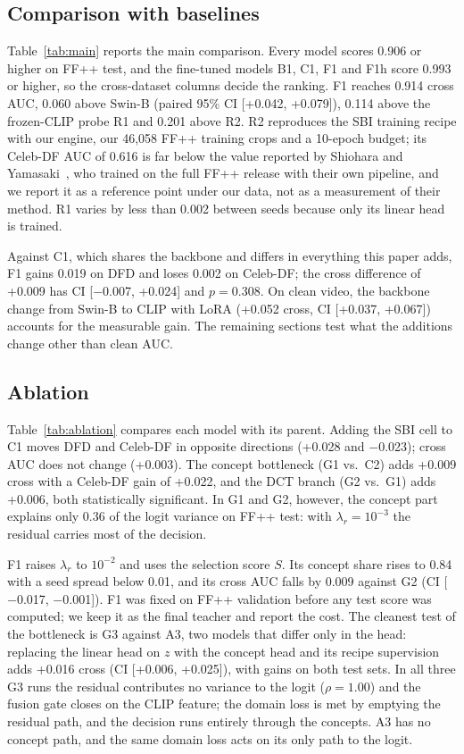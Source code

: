 \documentclass[conference]{IEEEtran}
\begin{document}


\subsection{Comparison with baselines}
Table~\ref{tab:main} reports the main comparison. Every model scores 0.906 or higher on FF++ test, and the
fine-tuned models B1, C1, F1 and F1h score 0.993 or higher, so the cross-dataset columns decide the ranking. F1 reaches 0.914 cross AUC, 0.060 above
Swin-B (paired 95\% CI [+0.042, +0.079]), 0.114 above the frozen-CLIP probe R1 and 0.201 above R2. R2 reproduces the
SBI training recipe with our engine, our 46,058 FF++ training crops and a 10-epoch budget; its Celeb-DF AUC of 0.616
is far below the value reported by Shiohara and Yamasaki~\cite{sbi}, who trained on the full FF++ release with their
own pipeline, and we report it as a reference point under our data, not as a measurement of their method. R1 varies
by less than 0.002 between seeds because only its linear head is trained.

Against C1, which shares the backbone and differs in everything this paper adds, F1 gains 0.019 on DFD and loses
0.002 on Celeb-DF; the cross difference of +0.009 has CI [$-$0.007, +0.024] and $p=0.308$. On clean video, the
backbone change from Swin-B to CLIP with LoRA (+0.052 cross, CI [+0.037, +0.067]) accounts for the measurable gain.
The remaining sections test what the additions change other than clean AUC.



\subsection{Ablation}
Table~\ref{tab:ablation} compares each model with its parent. Adding the SBI cell to C1 moves DFD and Celeb-DF in
opposite directions (+0.028 and $-$0.023); cross AUC does not change (+0.003). The concept bottleneck (G1 vs.\ C2) adds
+0.009 cross with a Celeb-DF gain of +0.022, and the DCT branch (G2 vs.\ G1) adds +0.006, both statistically
significant. In G1 and G2, however, the concept part explains only 0.36 of the logit variance on FF++ test: with
$\lambda_r=10^{-3}$ the residual carries most of the decision.

F1 raises $\lambda_r$ to $10^{-2}$ and uses the selection score $S$. Its concept share rises to 0.84 with a seed
spread below 0.01, and its cross AUC falls by 0.009 against G2 (CI [$-$0.017, $-$0.001]). F1 was fixed on FF++
validation before any test score was computed; we keep it as the final teacher and report the cost. The cleanest
test of the bottleneck is G3 against A3, two models that differ only in the head: replacing the linear head on $z$
with the concept head and its recipe supervision adds +0.016 cross (CI [+0.006, +0.025]), with gains on both test
sets. In all three G3 runs the residual contributes no variance to the logit ($\rho=1.00$) and the fusion gate closes
on the CLIP feature; the domain loss is met by emptying the residual path, and the decision runs entirely through the
concepts. A3 has no concept path, and the same domain loss acts on its only path to the logit.
\end{document}
